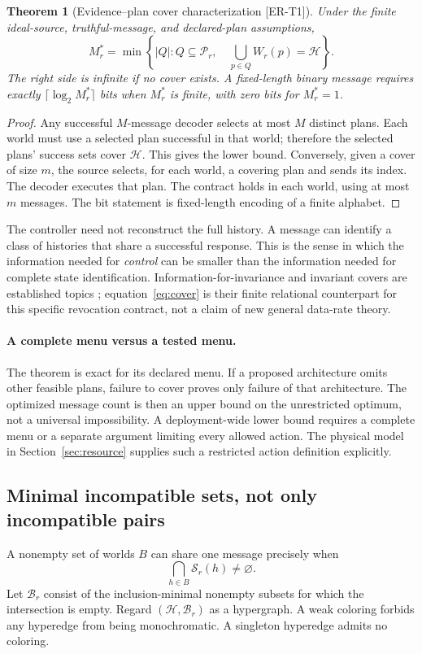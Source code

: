 \documentclass[11pt,a4paper]{article}
\newtheorem{theorem}{Theorem}
\theoremstyle{definition}\newtheorem{definition}{Definition}
\newcommand{\idtag}[1]{\textnormal{\textsf{[#1]}}}
\newcommand{\Hist}{\mathcal H}
\newcommand{\Plans}{\mathcal P}
\newcommand{\Succ}{\mathcal S}
\newcommand{\Bad}{\mathcal B}
\begin{document}
\begin{theorem}[Evidence--plan cover characterization \idtag{ER-T1}]
\label{thm:cover}
Under the finite ideal-source, truthful-message, and declared-plan assumptions,
\begin{equation}
\boxed{M_r^*=\min\left\{|Q|:Q\subseteq\Plans_r,\quad
\bigcup_{p\in Q}W_r(p)=\Hist\right\}.}
\label{eq:cover}
\end{equation}
The right side is infinite if no cover exists. A fixed-length binary message requires exactly $\lceil\log_2 M_r^*\rceil$ bits when $M_r^*$ is finite, with zero bits for $M_r^*=1$.
\end{theorem}
\begin{proof}
Any successful $M$-message decoder selects at most $M$ distinct plans. Each world must use a selected plan successful in that world; therefore the selected plans' success sets cover $\Hist$. This gives the lower bound. Conversely, given a cover of size $m$, the source selects, for each world, a covering plan and sends its index. The decoder executes that plan. The contract holds in each world, using at most $m$ messages. The bit statement is fixed-length encoding of a finite alphabet.
\end{proof}
The controller need not reconstruct the full history. A message can identify a class of histories that share a successful response. This is the sense in which the information needed for \emph{control} can be smaller than the information needed for complete state identification. Information-for-invariance and invariant covers are established topics \cite{tomar}; equation~\eqref{eq:cover} is their finite relational counterpart for this specific revocation contract, not a claim of new general data-rate theory.

\paragraph{A complete menu versus a tested menu.}
The theorem is exact for its declared menu. If a proposed architecture omits other feasible plans, failure to cover proves only failure of that architecture. The optimized message count is then an upper bound on the unrestricted optimum, not a universal impossibility. A deployment-wide lower bound requires a complete menu or a separate argument limiting every allowed action. The physical model in Section~\ref{sec:resource} supplies such a restricted action definition explicitly.

\subsection{Minimal incompatible sets, not only incompatible pairs}
A nonempty set of worlds $B$ can share one message precisely when
\begin{equation}
\bigcap_{h\in B}\Succ_r(h)\ne\varnothing.
\label{eq:intersection}
\end{equation}
Let $\Bad_r$ consist of the inclusion-minimal nonempty subsets for which the intersection is empty. Regard $(\Hist,\Bad_r)$ as a hypergraph. A weak coloring forbids any hyperedge from being monochromatic. A singleton hyperedge admits no coloring.
\end{document}

